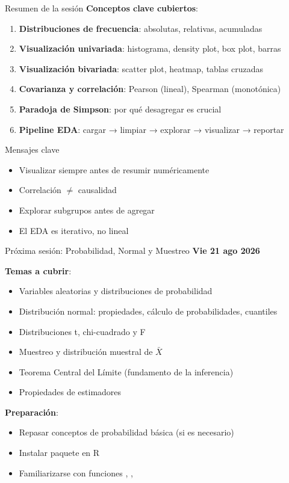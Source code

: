 \documentclass[aspectratio=169, 11pt]{beamer}
\begin{document}
\begin{frame}{Resumen de la sesión}
\textbf{Conceptos clave cubiertos}:

\begin{enumerate}
\item \textbf{Distribuciones de frecuencia}: absolutas, relativas, acumuladas
\item \textbf{Visualización univariada}: histograma, density plot, box plot, barras
\item \textbf{Visualización bivariada}: scatter plot, heatmap, tablas cruzadas
\item \textbf{Covarianza y correlación}: Pearson (lineal), Spearman (monotónica)
\item \textbf{Paradoja de Simpson}: por qué desagregar es crucial
\item \textbf{Pipeline EDA}: cargar → limpiar → explorar → visualizar → reportar
\end{enumerate}

\vspace{1em}
\begin{alertblock}{Mensajes clave}
\begin{itemize}
\item \alert{Visualizar siempre antes de resumir numéricamente}
\item \alert{Correlación $\neq$ causalidad}
\item \alert{Explorar subgrupos antes de agregar}
\item \alert{El EDA es iterativo, no lineal}
\end{itemize}
\end{alertblock}
\end{frame}

\begin{frame}{Próxima sesión: Probabilidad, Normal y Muestreo}
\textbf{Vie 21 ago 2026}

\textbf{Temas a cubrir}:
\begin{itemize}
\item Variables aleatorias y distribuciones de probabilidad
\item Distribución normal: propiedades, cálculo de probabilidades, cuantiles
\item Distribuciones t, chi-cuadrado y F
\item Muestreo y distribución muestral de $\bar{X}$
\item \alert{Teorema Central del Límite} (fundamento de la inferencia)
\item Propiedades de estimadores
\end{itemize}

\vspace{1em}
\textbf{Preparación}:
\begin{itemize}
\item Repasar conceptos de probabilidad básica (si es necesario)
\item Instalar paquete  en R
\item Familiarizarse con funciones , , 
\end{itemize}
\end{frame}
\end{document}
